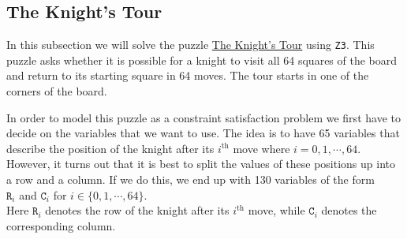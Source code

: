 \subsection{The Knight's Tour}
In this subsection we will solve the puzzle \href{https://en.wikipedia.org/wiki/Knight%27s_tour}{The Knight's Tour} 
using \texttt{Z3}.  This puzzle asks whether it is possible for a knight to visit all 64 squares of the board
and return to its starting square in 64 moves.  The tour starts in one of the corners of the board.  

In order to model this puzzle as a constraint satisfaction problem we first have to decide on the variables
that we want to use. The idea is to have 65 variables that describe the position of the knight after its
$i^{\mathrm{th}}$ move where $i=0,1,\cdots,64$.  However, it turns out that it is best to split the values of these positions up into a
row and a column.  If we do this, we end up with 130 variables of the form
\\[0.2cm]
\hspace*{1.3cm}
$\mathtt{R}_i$ and $\mathtt{C}_i$ \quad for $i \in \{0, 1, \cdots, 64\}$.
\\[0.2cm]
Here $\mathtt{R}_i$ denotes the row of the knight after its $i^{\mathrm{th}}$ move, while $\mathtt{C}_i$
denotes the corresponding column.  

